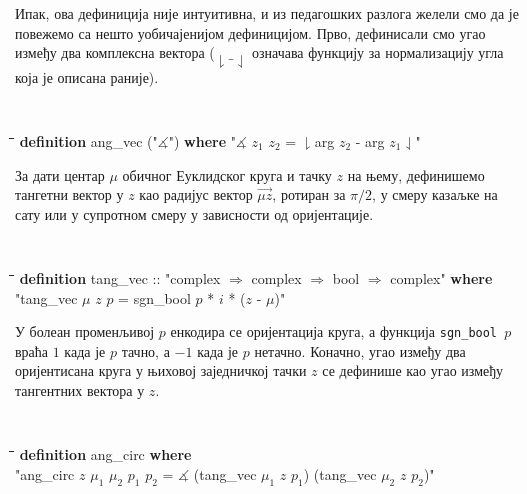 Ипак, ова дефиниција није интуитивна, и из педагошких разлога желели
смо да је повежемо са нешто уобичајенијом дефиницијом. Прво,
дефинисали смо угао између два комплексна вектора ($\downharpoonright
\_ \downharpoonleft$ означава функцију за нормализацију угла која је
описана раније).  {\tt
  \begin{tabbing}
    \hspace{5mm}\=\hspace{5mm}\=\hspace{5mm}\=\hspace{5mm}\=\hspace{5mm}\=\kill
{\bf definition} ang\_vec ("$\measuredangle$") {\bf where} "$\measuredangle$ $z_1$ $z_2$ = $\downharpoonright$arg $z_2$ - arg $z_1$$\downharpoonleft$"    
  \end{tabbing}
}

За дати центар $\mu$ обичног Еуклидског круга и тачку $z$ на њему,
дефинишемо тангетни вектор у $z$ као радијус вектор
$\overrightarrow{\mu z}$, ротиран за $\pi/2$, у смеру казаљке на сату
или у супротном смеру у зависности од оријентације.  {\tt
  \begin{tabbing}
    \hspace{5mm}\=\hspace{5mm}\=\hspace{5mm}\=\hspace{5mm}\=\hspace{5mm}\=\kill
{\bf definition} tang\_vec :: "complex $\Rightarrow$ complex $\Rightarrow$ bool $\Rightarrow$ complex" {\bf where}\\
\>"tang\_vec $\mu$ $z$ $p$ = sgn\_bool $p$ * $i$ * ($z$ - $\mu$)"
  \end{tabbing}
}
\noindent У болеан променљивој $p$ енкодира се оријентација круга, а
функција {\tt sgn\_bool $p$} враћа $1$ када је $p$ тачно, а $-1$ када
је $p$ нетачно. Коначно, угао између два оријентисана круга у њиховој
заједничкој тачки $z$ се дефинише као угао између тангентних вектора у
$z$.

{\tt
  \begin{tabbing}
    \hspace{5mm}\=\hspace{5mm}\=\hspace{5mm}\=\hspace{5mm}\=\hspace{5mm}\=\kill
{\bf definition} ang\_circ {\bf where}\\
\> "ang\_circ $z$ $\mu_1$ $\mu_2$ $p_1$ $p_2$ = $\measuredangle$ (tang\_vec $\mu_1$ $z$ $p_1$) (tang\_vec $\mu_2$ $z$ $p_2$)"
  \end{tabbing}
}

